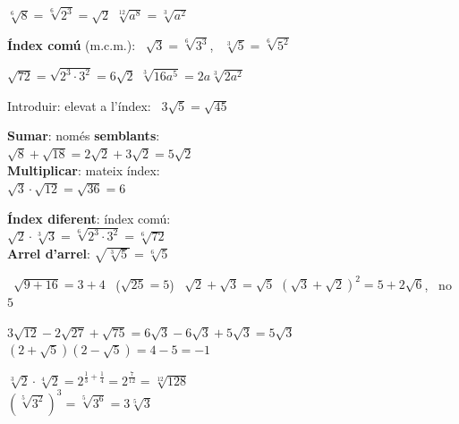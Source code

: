 \documentclass[11pt,a4paper]{article}
\newcommand{\mal}[1]{{\color{fmR}\faTimesCircle}\ {\color{fmR}\ensuremath{#1}}}
\begin{document}
\vfill
\begin{tcbraster}[raster columns=2,raster equal height,raster column skip=10pt]
\begin{tcolorbox}[fmbase,colback=fmdefbg,colframe=fmdef,coltitle=white,title={Simplificar: dividim pel m.c.d.}]
$\sqrt[6]{8}=\sqrt[6]{2^3}=\sqrt2$ \qquad $\sqrt[12]{a^8}=\sqrt[3]{a^2}$\par\smallskip
\textbf{Índex comú} (m.c.m.): \ $\sqrt3=\sqrt[6]{3^3}$, \ $\sqrt[3]5=\sqrt[6]{5^2}$
\end{tcolorbox}
\begin{tcolorbox}[fmbase,colback=fmdefbg,colframe=fmdef,coltitle=white,title={Extraure i introduir factors}]
$\sqrt{72}=\sqrt{2^3\cdot3^2}=6\sqrt2$ \qquad $\sqrt[3]{16a^5}=2a\sqrt[3]{2a^2}$\par\smallskip
Introduir: elevat a l'índex: \ $3\sqrt5=\sqrt{45}$
\end{tcolorbox}
\end{tcbraster}

\vfill
\begin{tcolorbox}[fmbase,colback=fmK!8,colframe=fmK,coltitle=white,title={Operacions}]
\begin{minipage}[t]{0.5\linewidth}
\textbf{Sumar}: només \textbf{semblants}:\\ $\sqrt8+\sqrt{18}=2\sqrt2+3\sqrt2=5\sqrt2$\\[3pt]
\textbf{Multiplicar}: mateix índex:\\ $\sqrt3\cdot\sqrt{12}=\sqrt{36}=6$
\end{minipage}\hfill
\begin{minipage}[t]{0.47\linewidth}
\textbf{Índex diferent}: índex comú:\\ $\sqrt2\cdot\sqrt[3]3=\sqrt[6]{2^3\cdot3^2}=\sqrt[6]{72}$\\[3pt]
\textbf{Arrel d'arrel}: $\sqrt{\sqrt[3]{5}}=\sqrt[6]5$
\end{minipage}
\end{tcolorbox}

\vfill
\begin{compte}
\mal{\sqrt{9+16}=3+4} \ ($\sqrt{25}=5$) \qquad \mal{\sqrt2+\sqrt3=\sqrt5} \qquad $\left(\sqrt3+\sqrt2\right)^2=5+2\sqrt6$, \ no $5$
\end{compte}

\vfill
\begin{exemple}[Exemples]
\begin{minipage}[t]{0.48\linewidth}
$3\sqrt{12}-2\sqrt{27}+\sqrt{75}=6\sqrt3-6\sqrt3+5\sqrt3=\boxed{5\sqrt3}$\\[4pt]
$\left(2+\sqrt5\right)\left(2-\sqrt5\right)=4-5=\boxed{-1}$
\end{minipage}\hfill
\begin{minipage}[t]{0.49\linewidth}
$\sqrt[3]2\cdot\sqrt[4]2=2^{\frac13+\frac14}=2^{\frac{7}{12}}=\boxed{\sqrt[12]{128}}$\\[4pt]
$\left(\sqrt[5]{3^2}\right)^3=\sqrt[5]{3^6}=\boxed{3\sqrt[5]{3}}$
\end{minipage}
\end{exemple}
\end{document}
